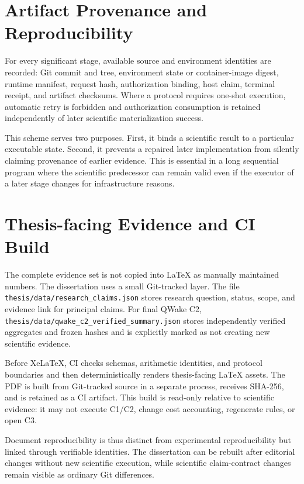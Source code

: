 \section{Artifact Provenance and Reproducibility}
\label{sec:method-provenance-en}

For every significant stage, available source and environment identities are recorded:
Git commit and tree, environment state or container-image digest, runtime manifest,
request hash, authorization binding, host claim, terminal receipt, and artifact
checksums. Where a protocol requires one-shot execution, automatic retry is forbidden
and authorization consumption is retained independently of later scientific
materialization success.

This scheme serves two purposes. First, it binds a scientific result to a particular
executable state. Second, it prevents a repaired later implementation from silently
claiming provenance of earlier evidence. This is essential in a long sequential
program where the scientific predecessor can remain valid even if the executor of a
later stage changes for infrastructure reasons.

\section{Thesis-facing Evidence and CI Build}
\label{sec:method-thesis-ci-en}

The complete evidence set is not copied into LaTeX as manually maintained numbers.
The dissertation uses a small Git-tracked layer. The file
\texttt{thesis/data/research\_claims.json} stores research question, status, scope,
and evidence link for principal claims. For final QWake C2,
\texttt{thesis/data/qwake\_c2\_verified\_summary.json} stores independently verified
aggregates and frozen hashes and is explicitly marked as not creating new scientific
evidence.

Before XeLaTeX, CI checks schemas, arithmetic identities, and protocol boundaries and
then deterministically renders thesis-facing LaTeX assets. The PDF is built from
Git-tracked source in a separate process, receives SHA-256, and is retained as a CI
artifact. This build is read-only relative to scientific evidence: it may not execute
C1/C2, change cost accounting, regenerate rules, or open C3.

Document reproducibility is thus distinct from experimental reproducibility but linked
through verifiable identities. The dissertation can be rebuilt after editorial
changes without new scientific execution, while scientific claim-contract changes
remain visible as ordinary Git differences.

